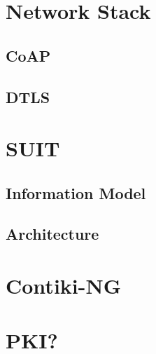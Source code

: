 \documentclass[0-thesis.tex]{subfiles}
\begin{document}
\section{Network Stack}
\subsection{CoAP}

\subsection{DTLS}

\section{SUIT}
\subsection{Information Model}

\subsection{Architecture}

\section{Contiki-NG}

\section{PKI?}
\end{document}
